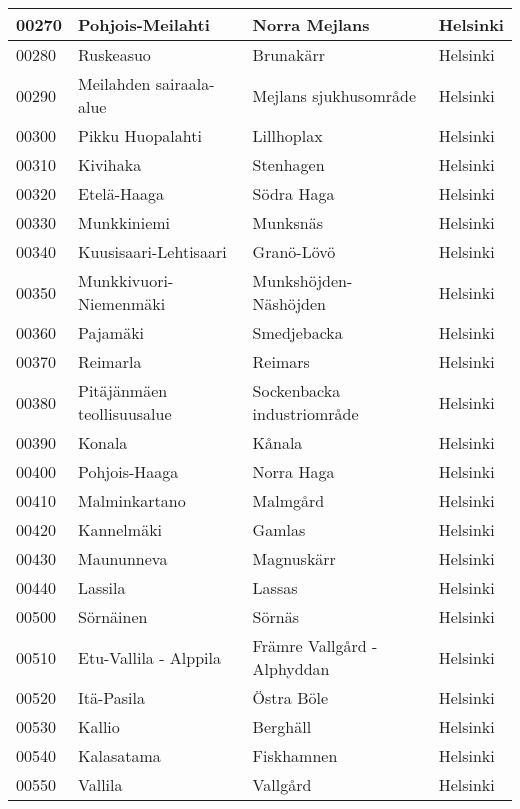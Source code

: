 \begin{longtable}{llll}
    00270 & Pohjois-Meilahti & Norra Mejlans & Helsinki \\ [0.25ex] \hline
    00280 & Ruskeasuo & Brunakärr & Helsinki \\ [0.25ex] \hline
    00290 & Meilahden sairaala-alue & Mejlans sjukhusområde & Helsinki \\ [0.25ex] \hline
    00300 & Pikku Huopalahti & Lillhoplax & Helsinki \\ [0.25ex] \hline
    00310 & Kivihaka & Stenhagen & Helsinki \\ [0.25ex] \hline
    00320 & Etelä-Haaga & Södra Haga & Helsinki \\ [0.25ex] \hline
    00330 & Munkkiniemi & Munksnäs & Helsinki \\ [0.25ex] \hline
    00340 & Kuusisaari-Lehtisaari & Granö-Lövö & Helsinki \\ [0.25ex] \hline
    00350 & Munkkivuori-Niemenmäki & Munkshöjden-Näshöjden & Helsinki\\ [0.25ex] \hline
    00360 & Pajamäki & Smedjebacka & Helsinki \\ [0.25ex] \hline
    00370 & Reimarla & Reimars & Helsinki \\ [0.25ex] \hline
    00380 & Pitäjänmäen teollisuusalue & Sockenbacka industriområde & Helsinki \\ [0.25ex] \hline
    00390 & Konala & Kånala & Helsinki \\ [0.25ex] \hline
    00400 & Pohjois-Haaga & Norra Haga & Helsinki \\ [0.25ex] \hline
    00410 & Malminkartano & Malmgård & Helsinki \\ [0.25ex] \hline
    00420 & Kannelmäki & Gamlas & Helsinki \\ [0.25ex] \hline
    00430 & Maununneva & Magnuskärr & Helsinki \\ [0.25ex] \hline
    00440 & Lassila & Lassas & Helsinki \\ [0.25ex] \hline
    00500 & Sörnäinen & Sörnäs & Helsinki \\ [0.25ex] \hline
    00510 & Etu-Vallila - Alppila & Främre Vallgård - Alphyddan & Helsinki \\ [0.25ex] \hline
    00520 & Itä-Pasila & Östra Böle & Helsinki \\ [0.25ex] \hline
    00530 & Kallio & Berghäll & Helsinki \\ [0.25ex] \hline
    00540 & Kalasatama & Fiskhamnen & Helsinki \\ [0.25ex] \hline
    00550 & Vallila & Vallgård & Helsinki \\ [0.25ex] \hline

\end{longtable}
